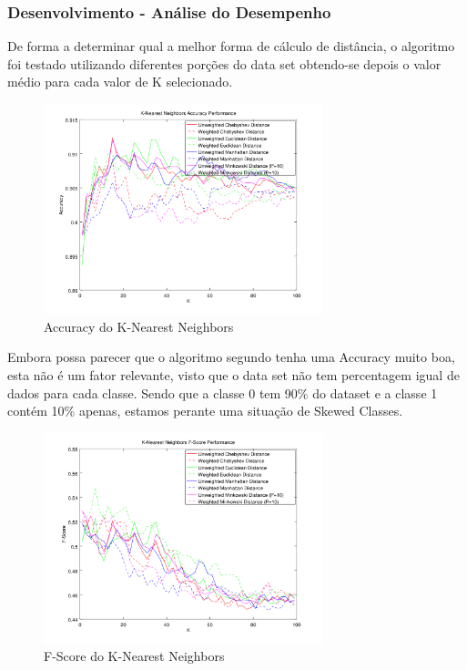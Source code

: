 \documentclass[portugues,final]{revdetua}
\begin{document}
\subsubsection{Desenvolvimento - Análise do Desempenho}

De forma a determinar qual a melhor forma de cálculo de distância, o algoritmo foi testado utilizando diferentes porções do data set obtendo-se depois o valor médio para cada valor de K selecionado.\\

\begin{figure}[H]
\centerline{\includegraphics[width=230pt]{images/knn_graph_accuracy.png}}
\caption{Accuracy do K-Nearest Neighbors}
\label{img:complete}
\end{figure}

Embora possa parecer que o algoritmo segundo tenha uma Accuracy muito boa, esta não é um fator relevante, visto que o data set não tem percentagem igual de dados para cada classe. Sendo que a classe 0 tem 90\% do dataset e a classe 1 contém 10\% apenas, estamos perante uma situação de Skewed Classes.\\

\begin{figure}[H]
\centerline{\includegraphics[width=230pt]{images/knn_graph_f-score.png}}
\caption{F-Score do K-Nearest Neighbors}
\label{img:complete}
\end{figure}
\end{document}
